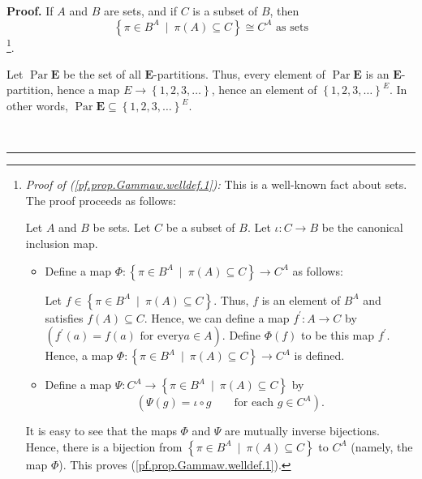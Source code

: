 \documentclass[numbers=enddot,12pt,final,onecolumn,notitlepage,abstracton]{scrartcl}
\theoremstyle{definition}
\newenvironment{proof}[1][Proof]{\noindent\textbf{#1.} }{\ \rule{0.5em}{0.5em}}
\newenvironment{verlong}{}{}
\begin{document}
\begin{verlong}
\begin{footnotesize}
\begin{proof}
If $A$ and $B$ are sets, and if $C$ is a subset of $B$, then
\begin{equation}
\left\{  \pi\in B^{A}\ \mid\ \pi\left(  A\right)  \subseteq C\right\}  \cong
C^{A}\text{ as sets} \label{pf.prop.Gammaw.welldef.1}%
\end{equation}
\footnote{\textit{Proof of (\ref{pf.prop.Gammaw.welldef.1}):} This is a
well-known fact about sets. The proof proceeds as follows:
\par
Let $A$ and $B$ be sets. Let $C$ be a subset of $B$. Let $\iota:C\rightarrow
B$ be the canonical inclusion map.
\par
\begin{itemize}
\item Define a map $\Phi:\left\{  \pi\in B^{A}\ \mid\ \pi\left(  A\right)
\subseteq C\right\}  \rightarrow C^{A}$ as follows:
\par
Let $f\in\left\{  \pi\in B^{A}\ \mid\ \pi\left(  A\right)  \subseteq
C\right\}  $. Thus, $f$ is an element of $B^{A}$ and satisfies $f \left(
A\right)  \subseteq C$. Hence, we can define a map $f^{\prime}:A\rightarrow C$
by $\left(  f^{\prime}\left(  a\right)  =f\left(  a\right)  \text{ for every
}a\in A\right)  $. Define $\Phi\left(  f\right)  $ to be this map $f^{\prime}%
$. Hence, a map $\Phi:\left\{  \pi\in B^{A}\ \mid\ \pi\left(  A\right)
\subseteq C\right\}  \rightarrow C^{A}$ is defined.
\par
\item Define a map $\Psi:C^{A}\rightarrow\left\{  \pi\in B^{A}\ \mid
\ \pi\left(  A\right)  \subseteq C\right\}  $ by
\[
\left(  \Psi\left(  g\right)  = \iota\circ g \qquad\text{for each } g \in
C^{A} \right)  .
\]
\end{itemize}
\par
It is easy to see that the maps $\Phi$ and $\Psi$ are mutually inverse
bijections. Hence, there is a bijection from $\left\{  \pi\in B^{A}\ \mid
\ \pi\left(  A\right)  \subseteq C\right\}  $ to $C^{A}$ (namely, the map
$\Phi$). This proves (\ref{pf.prop.Gammaw.welldef.1}).}.

Let $\operatorname*{Par}\mathbf{E}$ be the set of all $\mathbf{E}$-partitions.
Thus, every element of $\operatorname*{Par}\mathbf{E}$ is an $\mathbf{E}%
$-partition, hence a map $E\rightarrow\left\{  1,2,3,\ldots\right\}  $, hence
an element of $\left\{  1,2,3,\ldots\right\}  ^{E}$. In other words,
$\operatorname*{Par}\mathbf{E}\subseteq\left\{  1,2,3,\ldots\right\}  ^{E}$.


\end{proof}
\end{footnotesize}
\end{verlong}
\end{document}
